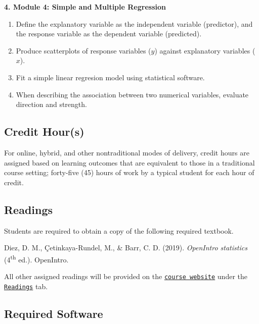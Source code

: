 \documentclass[
]{article}
\providecommand{\tightlist}{%
  \setlength{\itemsep}{0pt}\setlength{\parskip}{0pt}}
\begin{document}
\vspace{.25cm}

\textbf{4. Module 4: Simple and Multiple Regression}

\begin{enumerate}
\def\labelenumi{\arabic{enumi}.}
\tightlist
\item
  Define the explanatory variable as the independent variable
  (predictor), and the response variable as the dependent variable
  (predicted).
\item
  Produce scatterplots of response variables (\(y\)) against explanatory
  variables (\(x\)).
\item
  Fit a simple linear regresion model using statistical software.
\item
  When describing the association between two numerical variables,
  evaluate direction and strength.
\end{enumerate}

\subsection{Credit Hour(s)}

For online, hybrid, and other nontraditional modes of delivery, credit
hours are assigned based on learning outcomes that are equivalent to
those in a traditional course setting; forty-five (45) hours of work by
a typical student for each hour of credit.

\subsection{Readings}

Students are required to obtain a copy of the following required
textbook.

\begin{hangparas}{.4in}{1}
Diez, D. M.,  \c{C}etinkaya-Rundel, M., \& Barr, C. D. (2019).  {\em{OpenIntro statistics}} (4\textsuperscript{th} ed.).  OpenIntro.
\end{hangparas}

All other assigned readings will be provided on the
\texttt{\href{https://mycourses.umhb.edu/courses/23599}{course website}}
under the
\texttt{\href{https://mycourses.umhb.edu/courses/23599/files/folder/Readings}{Readings}}
tab.

\subsection{Required Software}
\end{document}
